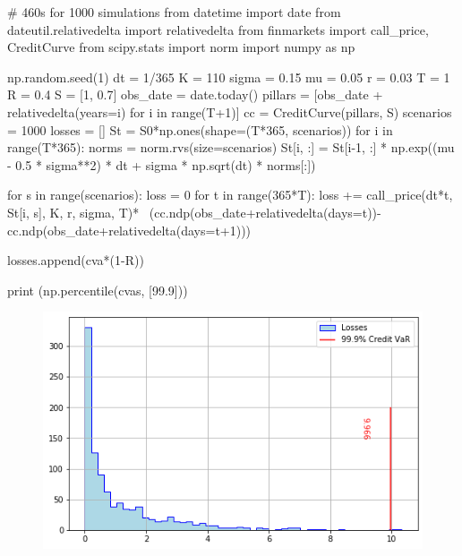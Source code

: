 \cprotEnv\begin{solution}

\begin{ipython}
# 460s for 1000 simulations
from datetime import date
from dateutil.relativedelta import relativedelta
from finmarkets import call_price, CreditCurve
from scipy.stats import norm
import numpy as np

np.random.seed(1)
dt = 1/365
K = 110
sigma = 0.15
mu = 0.05
r = 0.03
T = 1
R = 0.4
S = [1, 0.7]
obs_date = date.today()
pillars = [obs_date + relativedelta(years=i) for i in range(T+1)]
cc = CreditCurve(pillars, S)
scenarios = 1000
losses = []
St = S0*np.ones(shape=(T*365, scenarios))
for i in range(T*365):
    norms = norm.rvs(size=scenarios)
    St[i, :] = St[i-1, :] * np.exp((mu - 0.5 * sigma**2) * dt + sigma
        * np.sqrt(dt) * norms[:])

for s in range(scenarios):
    loss = 0
    for t in range(365*T):
        loss += call_price(dt*t, St[i, s], K, r, sigma, T)* \
            (cc.ndp(obs_date+relativedelta(days=t))-
             cc.ndp(obs_date+relativedelta(days=t+1)))

        losses.append(cva*(1-R))

print (np.percentile(cvas, [99.9]))
\end{ipython}
\begin{ioutput}
[9.96586061]
\end{ioutput}

\begin{figure}[htbp]
	\centering
\includegraphics[width=0.7\linewidth]{figures/cr_var_ex}
\end{figure}
\end{solution}





